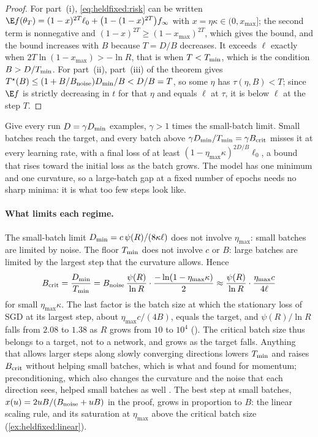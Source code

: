 \begin{refsection}
\begin{proof}
For part~(i), \eqref{eq:heldfixed:risk} can be written $\E f(\theta_T)=(1-x)^{2T}\ell_0+\bigl(1-(1-x)^{2T}\bigr)f_\infty$ with $x=\eta\kappa\in(0,x_{\max}]$; the second term is nonnegative and $(1-x)^{2T}\ge(1-x_{\max})^{2T}$, which gives the bound, and the bound increases with $B$ because $T=D/B$ decreases. It exceeds $\ell$ exactly when $2T\ln(1-x_{\max})>-\ln R$, that is when $T<T_{\min}$, which is the condition $B>D/T_{\min}$. For part~(ii), part~(iii) of the theorem gives $T^\star(B)\le(1+B/B_{\mathrm{noise}})D_{\min}/B<D/B=T$, so some $\eta$ has $\tau(\eta,B)<T$; since $\E f$ is strictly decreasing in $t$ for that $\eta$ and equals $\ell$ at $\tau$, it is below $\ell$ at the step $T$.
\end{proof}

Give every run $D=\gamma D_{\min}$ examples, $\gamma>1$ times the small-batch limit. Small batches reach the target, and every batch above $\gamma D_{\min}/T_{\min}=\gamma B_{\mathrm{crit}}$ misses it at every learning rate, with a final loss of at least $(1-\eta_{\max}\kappa)^{2D/B}\ell_0$, a bound that rises toward the initial loss as the batch grows. The model has one minimum and one curvature, so a large-batch gap at a fixed number of epochs needs no sharp minima: it is what too few steps look like.

\paragraph{What limits each regime.} The small-batch limit $D_{\min}=c\,\psi(R)/(8\kappa\ell)$ does not involve $\eta_{\max}$: small batches are limited by noise. The floor $T_{\min}$ does not involve $c$ or $B$: large batches are limited by the largest step that the curvature allows. Hence
\[
B_{\mathrm{crit}}=\frac{D_{\min}}{T_{\min}}=B_{\mathrm{noise}}\,\frac{\psi(R)}{\ln R}\cdot\frac{-\ln(1-\eta_{\max}\kappa)}{2}\approx\frac{\psi(R)}{\ln R}\cdot\frac{\eta_{\max}c}{4\ell}
\]
for small $\eta_{\max}\kappa$. The last factor is the batch size at which the stationary loss of SGD at its largest step, about $\eta_{\max}c/(4B)$, equals the target, and $\psi(R)/\ln R$ falls from $2.08$ to $1.38$ as $R$ grows from $10$ to $10^4$ (). The critical batch size thus belongs to a target, not to a network, and grows as the target falls. Anything that allows larger steps along slowly converging directions lowers $T_{\min}$ and raises $B_{\mathrm{crit}}$ without helping small batches, which is what \textcite{ZhangEtAl2019} and \textcite{ShallueEtAl2019} found for momentum; preconditioning, which also changes the curvature and the noise that each direction sees, helped small batches as well \parencite{ZhangEtAl2019}. The best step at small batches, $x(u)=2uB/(B_{\mathrm{noise}}+uB)$ in the proof, grows in proportion to $B$: the linear scaling rule, and its saturation at $\eta_{\max}$ above the critical batch size (\cref{ex:heldfixed:linear}).


\end{refsection}
